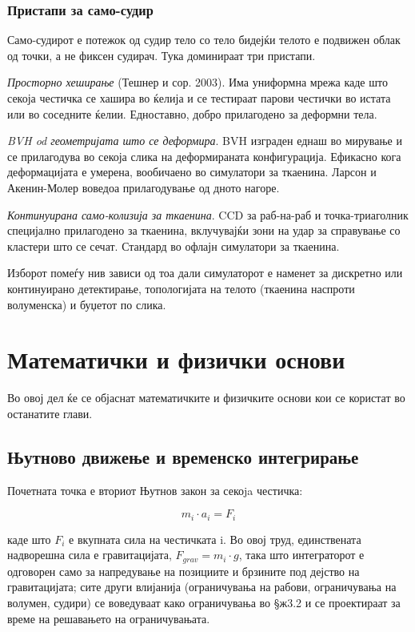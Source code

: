 \subsection{Пристапи за само-судир}
   
Само-судирот е потежок од судир тело со тело бидејќи телото е подвижен облак од точки, а не фиксен судирач. Тука доминираат три пристапи.

\textit{Просторно хеширање} (Тешнер и сор. 2003\cite{teschner2003optimized}). Има униформна мрежа каде што секоја честичка се хашира во ќелија и се тестираат парови честички во истата или во соседните ќелии. Едноставно, добро прилагодено за деформни тела.

\textit{BVH od геометријата што се деформира}. BVH изграден еднаш во мирување и се прилагодува во секоја слика на деформираната конфигурација. Ефикасно кога деформацијата е умерена, вообичаено во симулатори за ткаенина. Ларсон и Акенин-Молер \cite{larsson2001collision} воведоа прилагодување од дното нагоре.

\textit{Континуирана само-колизија за ткаенина}\cite{bridson2002robust}. CCD за раб-на-раб и точка-триаголник специјално прилагодено за ткаенина, вклучувајќи зони на удар за справување со кластери што се сечат. Стандард во офлајн симулатори за ткаенина.

Изборот помеѓу нив зависи од тоа дали симулаторот е наменет за дискретно или континуирано детектирање, топологијата на телото (ткаенина наспроти волуменска) и буџетот по слика.



\chapter{Математички и физички основи}

Во овој дел ќе се објаснат математичките и физичките основи кои се користат во останатите глави. 

\section{Њутново движење и временско интегрирање}
Почетната точка е вториот Њутнов закон за секоja честичка:

$$m_i \cdot a_i = F_i$$

каде што $F_i$ е вкупната сила на честичката i. Во овој труд, единствената надворешна сила е гравитацијата, $F_{grav} = m_i \cdot g$, така што интеграторот е одговорен само за напредување на позициите и брзините под дејство на гравитацијата; сите други влијанија (ограничувања на рабови, ограничувања на волумен, судири) се воведуваат како ограничувања во §ж3.2 и се проектираат за време на решавањето на ограничувањата.

